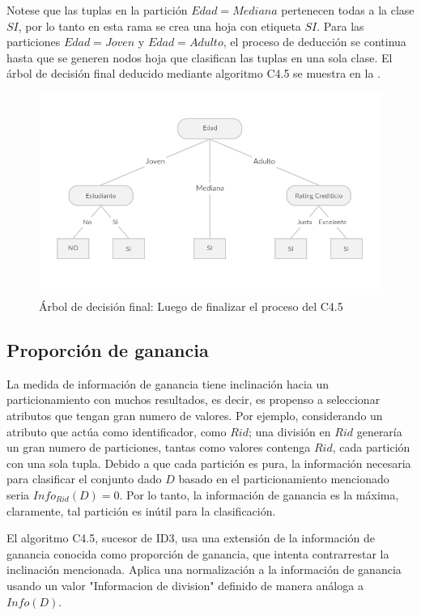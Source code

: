 Notese que las tuplas en la partición $Edad = Mediana$ pertenecen todas a la clase $SI$, por lo tanto en esta rama se crea una hoja con etiqueta $SI$. Para las particiones $Edad = Joven$ y $Edad = Adulto$, el proceso de deducción se continua hasta que se generen nodos hoja que clasifican las tuplas en una sola clase. El
 árbol de decisión final deducido mediante algoritmo C4.5 se muestra en la .
 
\begin{figure}[!tbph]
	\centering
	\includegraphics[width=0.7\linewidth]{capitulo-3/graphics/dtree_parti_final}
	\caption[Árbol de decisión final]{\label{fig:arbolFinal}Árbol de decisión final: Luego de finalizar el proceso del C4.5 }
\end{figure}


\subsection{Proporción de ganancia}
La medida de información de ganancia tiene inclinación hacia un particionamiento con muchos resultados, es decir, es propenso a seleccionar atributos que tengan gran numero de valores. Por ejemplo, considerando un atributo que actúa como identificador, como $Rid$; una división en $Rid$ generaría un gran numero de particiones, tantas como valores contenga $Rid$, cada partición con una sola tupla. Debido a que cada partición es pura, la información necesaria para clasificar el conjunto dado $D$ basado en el particionamiento mencionado seria $Info_{Rid}(D)=0$. Por lo tanto, la información de ganancia es la máxima, claramente, tal partición es inútil para la clasificación. 

El algoritmo C4.5, sucesor de ID3, usa una extensión de la información de ganancia conocida como proporción de ganancia, que intenta contrarrestar la inclinación mencionada.	Aplica una normalización a la información de ganancia usando un valor "Informacion de division" definido de manera análoga a $Info(D)$.

